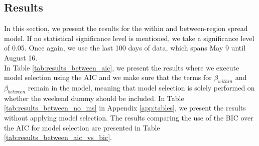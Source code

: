\documentclass[12pt]{article}
\begin{document}
	\subsection{Results} \label{subsec:model_between_results}
	In this section, we present the results for the within and between-region spread model. If no statistical significance level is mentioned, we take a significance level of 0.05. Once again, we use the last 100 days of data, which spans May 9 until August 16. \\
	
	In Table \ref{tab:results_between_aic}, we present the results where we execute model selection using the AIC and we make sure that the terms for $\beta_{within}$ and $\beta_{between}$ remain in the model, meaning that model selection is solely performed on whether the weekend dummy should be included. In Table \ref{tab:results_between_no_ms} in Appendix \ref{app:tables}, we present the results without applying model selection. The results comparing the use of the BIC over the AIC for model selection are presented in Table \ref{tab:results_between_aic_vs_bic}.
	
\end{document}
